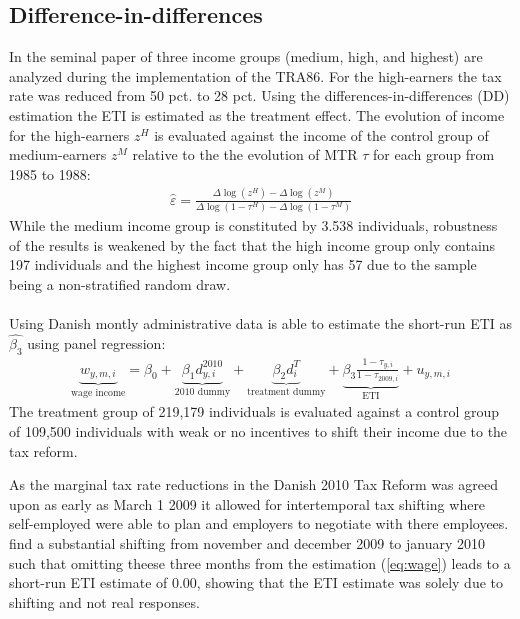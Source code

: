 \label{sec:empirics}
\subsection{Difference-in-differences}
In the seminal paper of \citet{feldstein1995effect} three income groups (medium, high, and highest) are analyzed during the implementation of the TRA86. For the high-earners the tax rate was reduced from 50 pct. to 28 pct. Using the differences-in-differences (DD) estimation the ETI is estimated as the treatment effect. The evolution of income for the high-earners $z^H$ is evaluated against the income of the control group of medium-earners $z^M$ relative to the the evolution of MTR $\tau$ for each group from 1985 to 1988:
\begin{align}
  \hat{\varepsilon}=\frac{\Delta \log(z^H) - \Delta \log(z^M)}{\Delta \log(1-\tau^H) - \Delta \log(1-\tau^M)}
  \label{eq:DD}
\end{align}
While the medium income group is constituted by 3.538 individuals, robustness of the results is weakened by the fact that the high income group only contains 197 individuals and the highest income group only has 57 due to the sample being a non-stratified random draw.
\\
\\
Using Danish montly administrative data \citet{kreiner2016tax} is able to estimate the short-run ETI as $\hat{\beta_3}$ using panel regression:
\begin{align}
  \underbrace{w_{y,m,i}}_\text{wage income} = \beta_0 + \underbrace{\beta_1d_{y,i}^{2010}}_\text{2010 dummy} + \underbrace{\beta_2d_i^T}_\text{treatment dummy} + \underbrace{\beta_3\frac{1-\tau_{y,i}}{1-\tau_{2009,i}}}_\text{ETI} + u_{y,m,i}
  \label{eq:wage}
\end{align}
The treatment group of 219,179 individuals is evaluated against a control group of 109,500 individuals with weak or no incentives to shift their income due to the tax reform.

As the marginal tax rate reductions in the Danish 2010 Tax Reform was agreed upon as early as March 1 2009 it allowed for intertemporal tax shifting where self-employed were able to plan and employers to negotiate with there employees. \citet{kreiner2016tax} find a substantial shifting from november and december 2009 to january 2010 such that omitting theese three months from the estimation (\ref{eq:wage}) leads to a short-run ETI estimate of 0.00, showing that the ETI estimate was solely due to shifting and not real responses.

